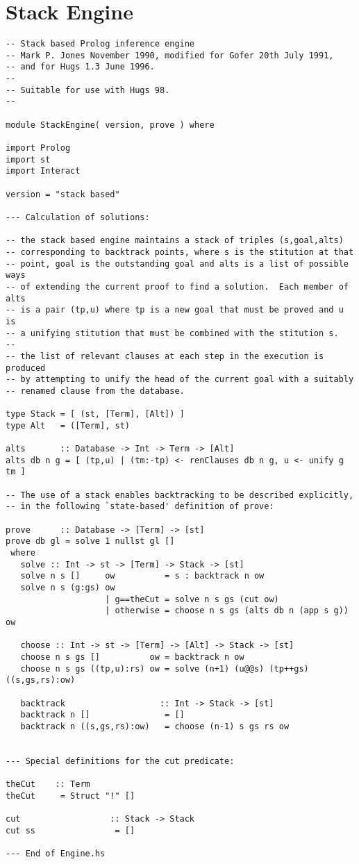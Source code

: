 \documentclass[thesis-solanki.tex]{files}
\begin{document}
\section{Stack Engine}
\begin{verbatim}
-- Stack based Prolog inference engine
-- Mark P. Jones November 1990, modified for Gofer 20th July 1991,
-- and for Hugs 1.3 June 1996.
--
-- Suitable for use with Hugs 98.
--

module StackEngine( version, prove ) where

import Prolog
import st
import Interact

version = "stack based"

--- Calculation of solutions:

-- the stack based engine maintains a stack of triples (s,goal,alts)
-- corresponding to backtrack points, where s is the stitution at that
-- point, goal is the outstanding goal and alts is a list of possible ways
-- of extending the current proof to find a solution.  Each member of alts
-- is a pair (tp,u) where tp is a new goal that must be proved and u is
-- a unifying stitution that must be combined with the stitution s.
--
-- the list of relevant clauses at each step in the execution is produced
-- by attempting to unify the head of the current goal with a suitably
-- renamed clause from the database.

type Stack = [ (st, [Term], [Alt]) ]
type Alt   = ([Term], st)

alts       :: Database -> Int -> Term -> [Alt]
alts db n g = [ (tp,u) | (tm:-tp) <- renClauses db n g, u <- unify g tm ]
      
-- The use of a stack enables backtracking to be described explicitly,
-- in the following `state-based' definition of prove:

prove      :: Database -> [Term] -> [st]
prove db gl = solve 1 nullst gl []
 where
   solve :: Int -> st -> [Term] -> Stack -> [st]
   solve n s []     ow          = s : backtrack n ow
   solve n s (g:gs) ow
                    | g==theCut = solve n s gs (cut ow)
                    | otherwise = choose n s gs (alts db n (app s g)) ow

   choose :: Int -> st -> [Term] -> [Alt] -> Stack -> [st]
   choose n s gs []          ow = backtrack n ow
   choose n s gs ((tp,u):rs) ow = solve (n+1) (u@@s) (tp++gs) ((s,gs,rs):ow)

   backtrack                   :: Int -> Stack -> [st]
   backtrack n []               = []
   backtrack n ((s,gs,rs):ow)   = choose (n-1) s gs rs ow


--- Special definitions for the cut predicate:

theCut    :: Term
theCut     = Struct "!" []

cut                  :: Stack -> Stack
cut ss                = []

--- End of Engine.hs
\end{verbatim}
\end{document}
